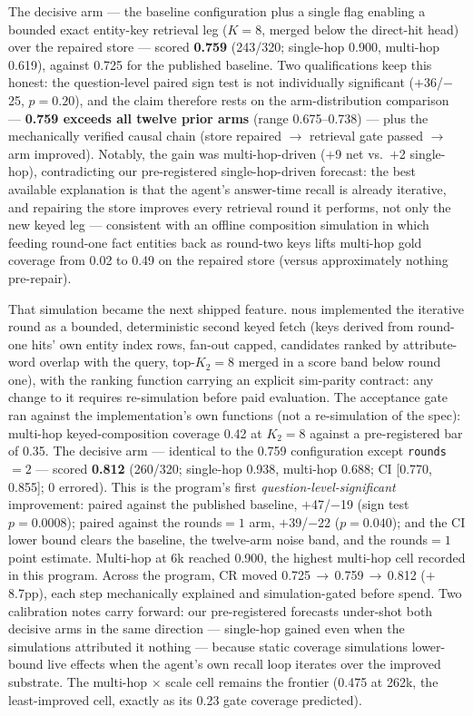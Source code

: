 \documentclass{article}
\newcommand{\nous}{\textsf{nous}}
\begin{document}
The decisive arm --- the baseline configuration plus a single flag enabling
a bounded exact entity-key retrieval leg ($K{=}8$, merged below the
direct-hit head) over the repaired store --- scored \textbf{0.759}
(243/320; single-hop 0.900, multi-hop 0.619), against 0.725 for the
published baseline. Two qualifications keep this honest: the question-level
paired sign test is not individually significant ($+$36/$-$25, $p{=}0.20$),
and the claim therefore rests on the arm-distribution comparison ---
\textbf{0.759 exceeds all twelve prior arms} (range 0.675--0.738) --- plus
the mechanically verified causal chain (store repaired $\to$ retrieval gate
passed $\to$ arm improved). Notably, the gain was multi-hop-driven ($+$9 net
vs.\ $+$2 single-hop), contradicting our pre-registered single-hop-driven
forecast: the best available explanation is that the agent's answer-time
recall is already iterative, and repairing the store improves every
retrieval round it performs, not only the new keyed leg --- consistent with
an offline composition simulation in which feeding round-one fact entities
back as round-two keys lifts multi-hop gold coverage from 0.02 to 0.49 on
the repaired store (versus approximately nothing pre-repair).

That simulation became the next shipped feature. \nous{} implemented the
iterative round as a bounded, deterministic second keyed fetch (keys derived
from round-one hits' own entity index rows, fan-out capped, candidates
ranked by attribute-word overlap with the query, top-$K_2{=}8$ merged in a
score band below round one), with the ranking function carrying an explicit
sim-parity contract: any change to it requires re-simulation before paid
evaluation. The acceptance gate ran against the implementation's own
functions (not a re-simulation of the spec): multi-hop keyed-composition
coverage 0.42 at $K_2{=}8$ against a pre-registered bar of 0.35. The
decisive arm --- identical to the 0.759 configuration except
\texttt{rounds}${=}2$ --- scored \textbf{0.812} (260/320; single-hop 0.938,
multi-hop 0.688; CI [0.770, 0.855]; 0 errored). This is the program's first
\emph{question-level-significant} improvement: paired against the published
baseline, $+$47/$-$19 (sign test $p{=}0.0008$); paired against the
rounds${=}1$ arm, $+$39/$-$22 ($p{=}0.040$); and the CI lower bound clears
the baseline, the twelve-arm noise band, and the rounds${=}1$ point
estimate. Multi-hop at 6k reached 0.900, the highest multi-hop cell
recorded in this program. Across the program, CR moved
0.725$\,\to\,$0.759$\,\to\,$0.812 ($+$8.7pp), each step mechanically
explained and simulation-gated before spend. Two calibration notes carry
forward: our pre-registered forecasts under-shot both decisive arms in the
same direction --- single-hop gained even when the simulations attributed it
nothing --- because static coverage simulations lower-bound live effects
when the agent's own recall loop iterates over the improved substrate. The
multi-hop $\times$ scale cell remains the frontier (0.475 at 262k, the
least-improved cell, exactly as its 0.23 gate coverage predicted).
\end{document}
